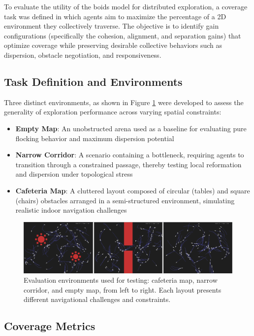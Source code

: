 \documentclass[12pt]{article}
\begin{document}
\begin{linenumbers}
To evaluate the utility of the boids model for distributed exploration, a coverage task was defined in which agents aim to maximize the percentage of a 2D environment they collectively traverse. The objective is to identify gain configurations (specifically the cohesion, alignment, and separation gains) that optimize coverage while preserving desirable collective behaviors such as dispersion, obstacle negotiation, and responsiveness.

\subsection{Task Definition and Environments}

Three distinct environments, as shown in Figure \ref{fig:boids_maps} were developed to assess the generality of exploration performance across varying spatial constraints:
\begin{itemize}[nosep]
    \item \textbf{Empty Map}: An unobstructed arena used as a baseline for evaluating pure flocking behavior and maximum dispersion potential
    \item \textbf{Narrow Corridor}: A scenario containing a bottleneck, requiring agents to transition through a constrained passage, thereby testing local reformation and dispersion under topological stress
    \item \textbf{Cafeteria Map}: A cluttered layout composed of circular (tables) and square (chairs) obstacles arranged in a semi-structured environment, simulating realistic indoor navigation challenges
\end{itemize}

\begin{figure}[h!]
    \centering
    \includegraphics[width=\linewidth]{boids_maps.png}
    \caption{Evaluation environments used for testing: cafeteria map, narrow corridor, and empty map, from left to right. Each layout presents different navigational challenges and constraints.}
    \label{fig:boids_maps}
  \end{figure}

\subsection{Coverage Metrics}


\end{linenumbers}
\end{document}
